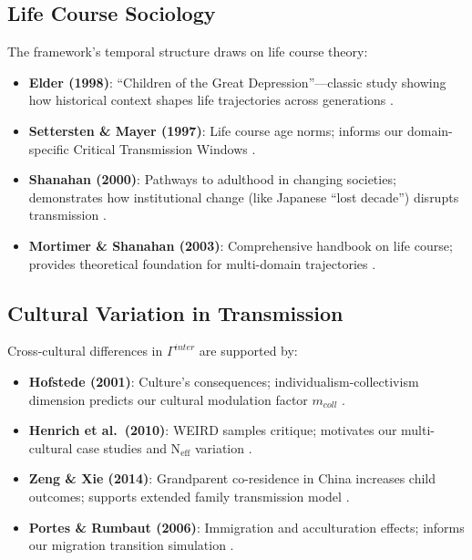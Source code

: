 \subsection{Life Course Sociology}

The framework's temporal structure draws on life course theory:

\begin{itemize}
\item \textbf{Elder (1998)}: ``Children of the Great Depression''---classic study showing
      how historical context shapes life trajectories across generations
      \citep{elder1998children}.

\item \textbf{Settersten \& Mayer (1997)}: Life course age norms; informs our
      domain-specific Critical Transmission Windows \citep{settersten1997measurement}.

\item \textbf{Shanahan (2000)}: Pathways to adulthood in changing societies;
      demonstrates how institutional change (like Japanese ``lost decade'')
      disrupts transmission \citep{shanahan2000pathways}.

\item \textbf{Mortimer \& Shanahan (2003)}: Comprehensive handbook on life course;
      provides theoretical foundation for multi-domain trajectories
      \citep{mortimer2003handbook}.
\end{itemize}

\subsection{Cultural Variation in Transmission}

Cross-cultural differences in $\Gamma^{inter}$ are supported by:

\begin{itemize}
\item \textbf{Hofstede (2001)}: Culture's consequences; individualism-collectivism
      dimension predicts our cultural modulation factor $m_{coll}$
      \citep{hofstede2001culture}.

\item \textbf{Henrich et al.~(2010)}: WEIRD samples critique; motivates our
      multi-cultural case studies and N$_{\text{eff}}$ variation
      \citep{henrich2010weirdest}.

\item \textbf{Zeng \& Xie (2014)}: Grandparent co-residence in China increases
      child outcomes; supports extended family transmission model
      \citep{zeng2014effects}.

\item \textbf{Portes \& Rumbaut (2006)}: Immigration and acculturation effects;
      informs our migration transition simulation \citep{portes2006immigrant}.
\end{itemize}

